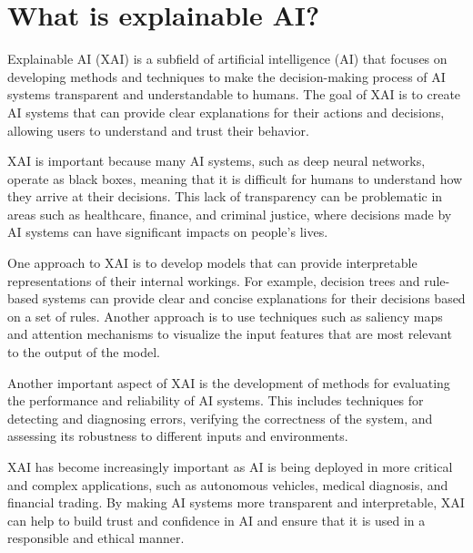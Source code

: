 \section{What is explainable AI?}
Explainable AI (XAI) is a subfield of artificial intelligence (AI) that focuses on developing methods and techniques to make the decision-making process of AI systems transparent and understandable to humans. The goal of XAI is to create AI systems that can provide clear explanations for their actions and decisions, allowing users to understand and trust their behavior.

XAI is important because many AI systems, such as deep neural networks, operate as black boxes, meaning that it is difficult for humans to understand how they arrive at their decisions. This lack of transparency can be problematic in areas such as healthcare, finance, and criminal justice, where decisions made by AI systems can have significant impacts on people's lives.

One approach to XAI is to develop models that can provide interpretable representations of their internal workings. For example, decision trees and rule-based systems can provide clear and concise explanations for their decisions based on a set of rules. Another approach is to use techniques such as saliency maps and attention mechanisms to visualize the input features that are most relevant to the output of the model.

Another important aspect of XAI is the development of methods for evaluating the performance and reliability of AI systems. This includes techniques for detecting and diagnosing errors, verifying the correctness of the system, and assessing its robustness to different inputs and environments.

XAI has become increasingly important as AI is being deployed in more critical and complex applications, such as autonomous vehicles, medical diagnosis, and financial trading. By making AI systems more transparent and interpretable, XAI can help to build trust and confidence in AI and ensure that it is used in a responsible and ethical manner.


